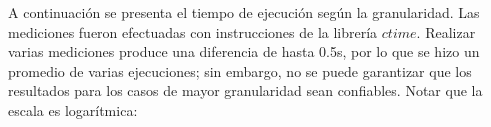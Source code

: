 \documentclass[a4paper]{article}
\begin{document}
A continuación se presenta el tiempo de ejecución según la granularidad. Las mediciones fueron  efectuadas con instrucciones de la librería $ctime$. Realizar varias mediciones produce una diferencia de hasta 0.5s, por lo que se hizo un promedio de varias ejecuciones; sin embargo, no se puede garantizar que los resultados para los casos de mayor granularidad sean confiables. Notar que la escala es logarítmica:
\end{document}

